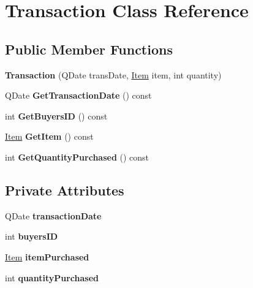 \hypertarget{class_transaction}{}\section{Transaction Class Reference}
\label{class_transaction}
\subsection*{Public Member Functions}
\begin{DoxyCompactItemize}
\item 
\mbox{\label{class_transaction_adbaf08ebfc9818b158108c715864d535}} 
{\bfseries Transaction} (Q\+Date trans\+Date, \mbox{\hyperlink{class_item}{Item}} item, int quantity)
\item 
\mbox{\label{class_transaction_a4460ca592783e1cb0f67dd0b974cb2ba}} 
Q\+Date {\bfseries Get\+Transaction\+Date} () const
\item 
\mbox{\label{class_transaction_a58d5c852fc5ca0599df9298d23996bde}} 
int {\bfseries Get\+Buyers\+ID} () const
\item 
\mbox{\label{class_transaction_a8af32e7e0db74a1990d7a887e658c618}} 
\mbox{\hyperlink{class_item}{Item}} {\bfseries Get\+Item} () const
\item 
\mbox{\label{class_transaction_a3edb74863df1a30670611c0d8b50a0fb}} 
int {\bfseries Get\+Quantity\+Purchased} () const
\end{DoxyCompactItemize}
\subsection*{Private Attributes}
\begin{DoxyCompactItemize}
\item 
\mbox{\label{class_transaction_af3f72cef9584004ed37d7ae5c4ee041f}} 
Q\+Date {\bfseries transaction\+Date}
\item 
\mbox{\label{class_transaction_a5162cf57576d0ae0e41e6339d5ba8dae}} 
int {\bfseries buyers\+ID}
\item 
\mbox{\label{class_transaction_a98968a4ca4fdd90a2683b1bcf20c536f}} 
\mbox{\hyperlink{class_item}{Item}} {\bfseries item\+Purchased}
\item 
\mbox{\label{class_transaction_ac4d79a9bd07ce1a8eb5f990afcd9c8f0}} 
int {\bfseries quantity\+Purchased}
\end{DoxyCompactItemize}


